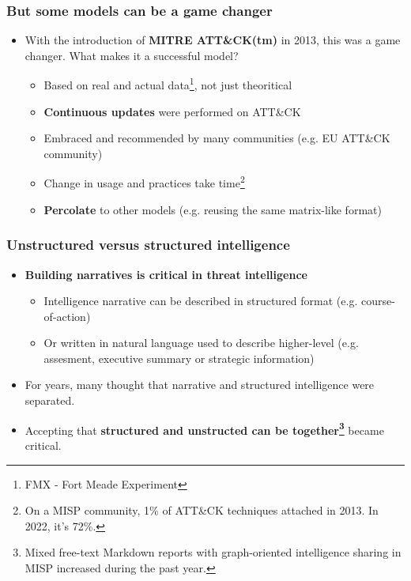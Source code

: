 \begin{frame}
  \frametitle{But some models can be a game changer}
  \begin{itemize}
      \item With the introduction of {\bf MITRE ATT\&CK(tm)} in 2013, this was a game changer. What makes it a successful model?
     \begin{itemize}
        \item Based on real and actual data\footnote{FMX - Fort Meade Experiment}, not just theoritical
        \item {\bf Continuous updates} were performed on ATT\&CK
        \item Embraced and recommended by many communities (e.g. EU ATT\&CK community)
        \item Change in usage and practices take time\footnote{On a MISP community, 1\% of ATT\&CK techniques attached in 2013. In 2022, it's 72\%.}
        \item {\bf Percolate} to other models (e.g. reusing the same matrix-like format)
     \end{itemize}
  \end{itemize}
\end{frame}

\begin{frame}
  \frametitle{Unstructured versus structured intelligence}
  \begin{itemize}
      \item {\bf Building narratives is critical in threat intelligence}
        \begin{itemize}
            \item Intelligence narrative can be described in structured format (e.g. course-of-action)
            \item Or written in natural language used to describe higher-level  (e.g. assesment, executive summary or strategic information) 
        \end{itemize}
      \item For years, many thought that narrative and structured intelligence were separated.
      \item Accepting that {\bf structured and unstructed can be together\footnote{Mixed free-text Markdown reports with graph-oriented intelligence sharing in MISP increased during the past year.}} became critical.
  \end{itemize}
\end{frame}

